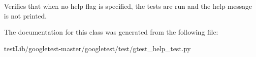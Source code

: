 \begin{DoxyVerb}Verifies that when no help flag is specified, the tests are run
and the help message is not printed.\end{DoxyVerb}
 

The documentation for this class was generated from the following file\+:\begin{DoxyCompactItemize}
\item 
test\+Lib/googletest-\/master/googletest/test/gtest\+\_\+help\+\_\+test.\+py\end{DoxyCompactItemize}

